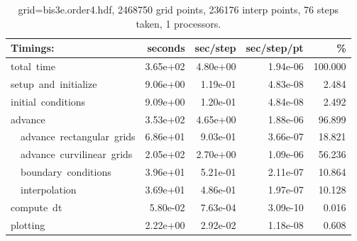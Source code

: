 \begin{table}[hbt]
\begin{center}\footnotesize
\begin{tabular}{|l|r|r|r|r|} \hline
  Timings:   &  seconds &    sec/step  &  sec/step/pt &  \%    \\ \hline
total~time\dotfill &   3.65e+02 &   4.80e+00 &   1.94e-06 & 100.000 \\ 
setup~and~initialize\dotfill &   9.06e+00 &   1.19e-01 &   4.83e-08 &   2.484 \\ 
initial~conditions\dotfill &   9.09e+00 &   1.20e-01 &   4.84e-08 &   2.492 \\ 
advance\dotfill &   3.53e+02 &   4.65e+00 &   1.88e-06 &  96.899 \\ 
~~advance~rectangular~grids\dotfill &   6.86e+01 &   9.03e-01 &   3.66e-07 &  18.821 \\ 
~~advance~curvilinear~grids\dotfill &   2.05e+02 &   2.70e+00 &   1.09e-06 &  56.236 \\ 
~~boundary~conditions\dotfill &   3.96e+01 &   5.21e-01 &   2.11e-07 &  10.864 \\ 
~~interpolation\dotfill &   3.69e+01 &   4.86e-01 &   1.97e-07 &  10.128 \\ 
compute~dt\dotfill &   5.80e-02 &   7.63e-04 &   3.09e-10 &   0.016 \\ 
plotting\dotfill &   2.22e+00 &   2.92e-02 &   1.18e-08 &   0.608 \\ 
 \hline 
\end{tabular}
\end{center}
\caption{grid=bis3e.order4.hdf, 2468750 grid points, 236176 interp points, 76 steps taken, 1 processors.}
\label{tab:bis3e.order4.hdf}
\end{table}


